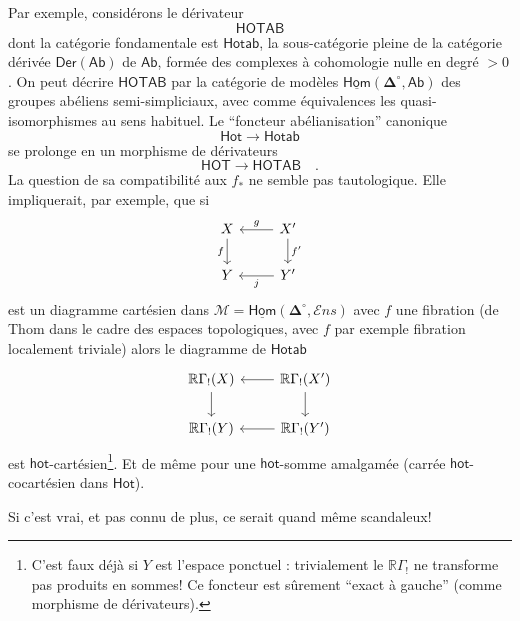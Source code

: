 \documentclass[11pt]{article}
\newcommand{\printedpage}[1]{\marginpar{\footnotesize p.~#1}}
\newcommand{\msp}[1]{\marginpar{\footnotesize [#1]}}
\newcommand{\uHom}{\underline{\mathsf{Hom}}}
\newcommand{\bDelta}{\boldsymbol{\Delta}}
\newcommand{\Ens}{\mathcal{E}ns}
\begin{document}
\printedpage{12}
\noindent\msp{page 15}Par exemple, considérons le dérivateur
\[
\mathsf{HOTAB}
\]
dont la catégorie fondamentale est $\mathsf{Hotab}$, la sous-catégorie pleine de la catégorie dérivée $\mathsf{Der}(\mathsf{Ab})$ de $\mathsf{Ab}$, formée des complexes à cohomologie nulle en degré $> 0$. On peut décrire $\mathsf{HOTAB}$ par la catégorie de modèles $\uHom(\bDelta^\circ,\mathsf{Ab})$ des groupes abéliens semi-simpliciaux, avec comme équivalences les quasi-isomorphismes au sens habituel. Le “foncteur abélianisation” canonique
\[
\mathsf{Hot} \longrightarrow \mathsf{Hotab}
\]
se prolonge en un morphisme de dérivateurs
\[
\mathsf{HOT} \longrightarrow \mathsf{HOTAB} \quad .
\]
La question de sa compatibilité aux $f_*$ ne semble pas tautologique. Elle impliquerait, par exemple, que si
\[
\begin{tikzcd}
X \arrow[d, "f"'] & X' \arrow[l, "g"'] \arrow[d, "f'"] \\
Y & Y' \arrow[l, "j"]
\end{tikzcd}
\]
est un diagramme cartésien dans $\mathcal{M} = \uHom(\bDelta^\circ,\Ens)$ avec $f$ une fibration (de Thom dans le cadre des espaces topologiques, avec $f$ par exemple fibration localement triviale) alors le diagramme de $\mathsf{Hotab}$
\[
\begin{tikzcd}
\mathbb{R}\Gamma_!(X) \arrow[d] & \mathbb{R}\Gamma_!(X') \arrow[l] \arrow[d] \\
\mathbb{R}\Gamma_!(Y) & \mathbb{R}\Gamma_!(Y') \arrow[l]
\end{tikzcd}
\]
est $\mathsf{hot}$-cartésien\footnote[7]{C’est faux déjà si $Y$ est l’espace ponctuel : trivialement le $\mathbb{R}\Gamma_!$ ne transforme pas produits en sommes! Ce foncteur est sûrement “exact à gauche” (comme morphisme de dérivateurs).}. Et de même pour une $\mathsf{hot}$-somme amalgamée (carrée $\mathsf{hot}$-cocartésien dans $\mathsf{Hot}$). %

\noindent\msp{page 16}Si c’est vrai, et pas connu de plus, ce serait quand même scandaleux!
\end{document}
